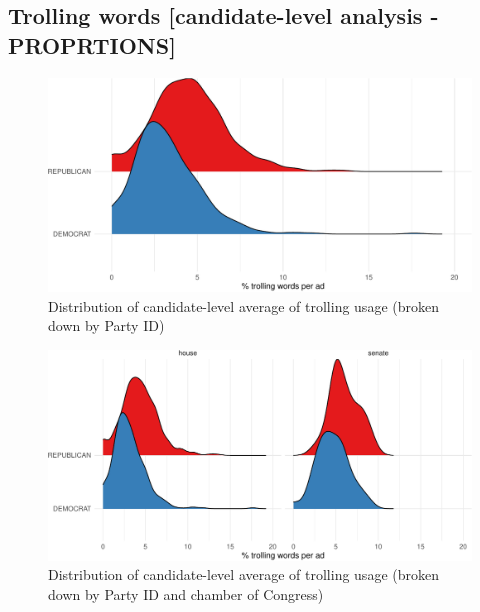\documentclass[
  12pt,
]{article}
\begin{document}
\pagebreak
\clearpage

\hypertarget{trolling-words-candidate-level-analysis---proprtions}{%
\subsection{Trolling words {[}candidate-level analysis - PROPRTIONS{]}}\label{trolling-words-candidate-level-analysis---proprtions}}

\begin{figure}
\centering
\includegraphics{figsFB/unnamed-chunk-12-1.pdf}
\caption{\label{fig:unnamed-chunk-12}Distribution of candidate-level average of trolling usage (broken down by Party ID)}
\end{figure}

\begin{figure}
\centering
\includegraphics{figsFB/unnamed-chunk-13-1.pdf}
\caption{\label{fig:unnamed-chunk-13}Distribution of candidate-level average of trolling usage (broken down by Party ID and chamber of Congress)}
\end{figure}
\end{document}
